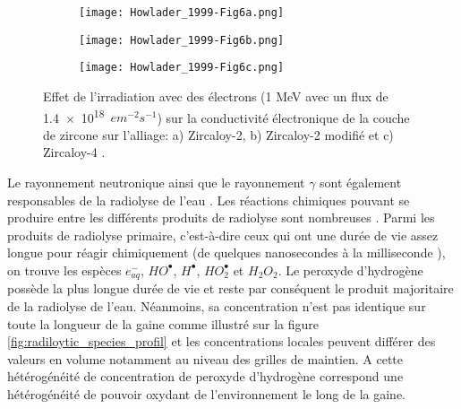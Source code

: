 \begin{refsection}
    \begin{figure}[H]
        \centering
        \begin{subfigure}[b]{0.48\textwidth}
            \texttt{[image: Howlader\_1999-Fig6a.png]}
            \caption{}
            \label{subfig:conductivity_gamma_Zy2}
        \end{subfigure}
        \quad
        \begin{subfigure}[b]{0.48\textwidth}
            \texttt{[image: Howlader\_1999-Fig6b.png]}
            \caption{}
            \label{subfig:conductivity_gamma_improved_Zy2}
        \end{subfigure}
        \quad
        \begin{subfigure}[b]{0.48\textwidth}
            \texttt{[image: Howlader\_1999-Fig6c.png]}
            \caption{}
            \label{subfig:conductivity_gamma_Zy4}
        \end{subfigure}
    \caption[Effet de l'irradiation avec des électrons (1 MeV avec un flux de \num{1.4e18}~$e m^{-2} s^{-1}$) sur la conductivité électronique
    de la couche de zircone sur l'alliage: a) Zircaloy-2, b) Zircaloy-2 modifié et c) Zircaloy-4.]
    {Effet de l'irradiation avec des électrons (1 MeV avec un flux de \num{1.4e18}~$e m^{-2} s^{-1}$) sur la conductivité électronique
    de la couche de zircone sur l'alliage: a) Zircaloy-2, b) Zircaloy-2 modifié et c) Zircaloy-4 \citep{Howlader1999}.}
    \label{fig:conductivty_electron_beam}
    \end{figure} 
    
    Le rayonnement neutronique ainsi que le rayonnement $\gamma$ sont également responsables de la radiolyse de l'eau
    \citep{Cowan2011}. Les réactions chimiques pouvant se produire entre les différents produits de radiolyse sont
    nombreuses \citep{Trupin-Wasselin2000, Auclair2001}. Parmi les produits de radiolyse primaire, c'est-à-dire ceux
    qui ont une durée de vie assez longue pour réagir chimiquement (de quelques nanosecondes à la milliseconde \citep{Trupin-Wasselin2000}), on trouve les espèces $e^-_{aq}$, $HO^{\bullet}$,
    $H^{\bullet} $,  $HO_2^{\bullet}$ et $H_2O_2$. Le peroxyde d’hydrogène possède la plus longue durée de vie et
    reste par conséquent le produit majoritaire de la radiolyse de l'eau. Néanmoins, sa concentration n'est pas
    identique sur toute la longueur de la gaine comme illustré sur la figure \ref{fig:radiloytic_species_profil} et les
    concentrations locales peuvent différer des valeurs en volume notamment au niveau des grilles de maintien. A cette 
    hétérogénéité de concentration de peroxyde d'hydrogène correspond une hétérogénéité de pouvoir oxydant de
    l'environnement le long de la gaine.  


\end{refsection}
